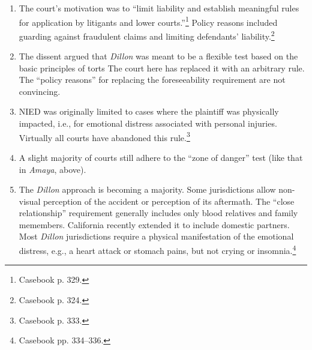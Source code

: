 \begin{enumerate}
\begin{enumerate}
    \end{enumerate}
    \item The court's motivation was to ``limit liability and establish meaningful rules for application by litigants and lower courts.''\footnote{Casebook p. 329.} Policy reasons included guarding against fraudulent claims and limiting defendants' liability.\footnote{Casebook p. 324.}
    \item The dissent argued that \emph{Dillon} was meant to be a flexible test based on the basic principles of torts The court here has replaced it with an arbitrary rule. The ``policy reasons'' for replacing the foreseeability requirement are not convincing.
    \item NIED was originally limited to cases where the plaintiff was physically impacted, i.e., for emotional distress associated with personal injuries. Virtually all courts have abandoned this rule.\footnote{Casebook p. 333.}
    \item A slight majority of courts still adhere to the ``zone of danger'' test (like that in \emph{Amaya}, above).
    \item The \emph{Dillon} approach is becoming a majority. Some jurisdictions allow non-visual perception of the accident or perception of its aftermath. The ``close relationship'' requirement generally includes only blood relatives and family memembers. California recently extended it to include domestic partners. Most \emph{Dillon} jurisdictions require a physical manifestation of the emotional distress, e.g., a heart attack or stomach pains, but not crying or insomnia.\footnote{Casebook pp. 334--336.}
\end{enumerate}

